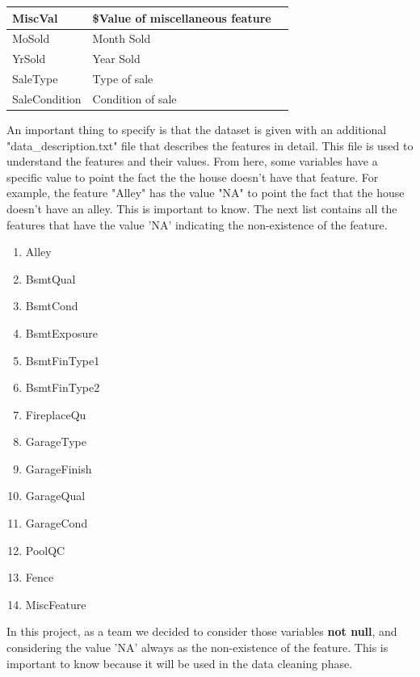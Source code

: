 \begin{longtable}{|l|p{3cm}|p{4cm}|}
    \hline
    MiscVal          & \$Value of miscellaneous feature                                                                 \\
    \hline
    MoSold           & Month Sold                                                                                       \\
    \hline
    YrSold           & Year Sold                                                                                        \\
    \hline
    SaleType         & Type of sale                                                                                     \\
    \hline
    SaleCondition    & Condition of sale                                                                                \\
\end{longtable}


An important thing to specify is that the dataset is given with an additional "data\_description.txt" file that describes the features in detail. This file is used to understand the features and their values. From here, some
variables have a specific value to point the fact the the house doesn't have that feature. For example, the feature "Alley" has the value "NA" to point the fact that the house doesn't have an alley. This is important to know.
The next list contains all the features that have the value 'NA' indicating the non-existence of the feature.
\begin{enumerate}
    \item Alley
    \item BsmtQual
    \item BsmtCond
    \item BsmtExposure
    \item BsmtFinType1
    \item BsmtFinType2
    \item FireplaceQu
    \item GarageType
    \item GarageFinish
    \item GarageQual
    \item GarageCond
    \item PoolQC
    \item Fence
    \item MiscFeature
\end{enumerate}

In this project, as a team we decided to consider those variables \textbf{not null}, and considering the value 'NA' always as the non-existence of the feature. This is important to know because it will be used in the data cleaning phase.

